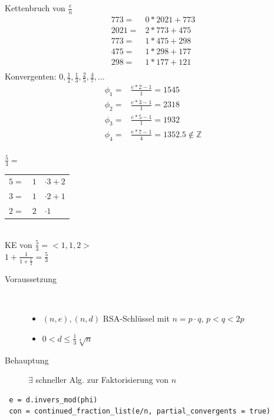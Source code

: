 \documentclass[10pt]{article}
\newcommand{\Oneover}[1]{\frac{1}{#1}} %
\begin{document}
\begin{multicols}{2}
Kettenbruch von $\frac{e}{n}$\\
\begin{align*}
773 =& 0 * 2021 + 773 \\
2021 =& 2*773 + 475 \\
773 =& 1*475 + 298 \\
475 =& 1*298 + 177 \\
298 =& 1*177 + 121 \\
\end{align*}
Konvergenten: $0, \frac{1}{2}, \frac{1}{3}, \frac{2}{5}, \frac{4}{7}, \ldots$
\begin{align*}
\phi_1 =& \frac{e*2-1}{1} = 1545\\
\phi_2 =& \frac{e*3-1}{1} = 2318\\
\phi_3 =& \frac{e*5-1}{1} = 1932\\
\phi_4 =& \frac{e*7-1}{4} = 1352.5 \notin \mathbb{Z}\\
\end{align*}
\end{multicols}
$\frac{5}{3}=$\\
\begin{tabular}{l|c|l}\cline{2-1}
 $5=$&$1$&$\cdot3+2$\\
 $3=$&$1$&$\cdot2+1$\\
 $2=$&$2$&$\cdot1$\\\cline{2-1}
\end{tabular}\\\linebreak
{\color{red}KE von $\frac{5}{3}=<1,1,2>$}\\
$1+\frac{1}{1+\frac{1}{2}}=\frac{5}{3}$\\
\begin{description}
 \item [Voraussetzung] \hfill \\
    \begin{itemize}
      \item $(n,e),(n,d)$ RSA-Schlüssel mit $n=p\cdot q$, $p<q<2p$
      \item $0<d\leqslant\Oneover{3}\sqrt[4]{n}$
    \end{itemize}
 \item [Behauptung] $\exists$ schneller Alg. zur Faktorisierung von $n$
\end{description}
\begin{lstlisting}
 e = d.invers_mod(phi)
 con = continued_fraction_list(e/n, partial_convergents = true)
\end{lstlisting}
\end{document}
